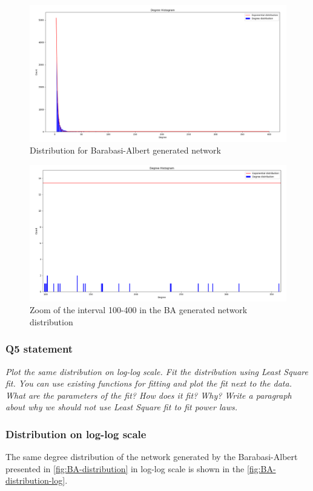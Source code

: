 \documentclass{article}
\begin{document}
\begin{figure}[h]
  \centering
  \includegraphics[scale=0.35]{fig/BA-distribution.png}
  \caption{Distribution for Barabasi-Albert generated network}
  \label{fig:BA-distribution}
\end{figure} 

\newpage
\begin{figure}[h]
  \centering
  \includegraphics[scale=0.3]{fig/BA-distribution-zoom.png}
  \caption{Zoom of the interval 100-400 in the BA generated network distribution}
  \label{fig:BA-distribution-zoom}
\end{figure} 


\subsubsection{Q5 statement}
\textit{Plot the same distribution on log-log scale. Fit the distribution using Least Square fit. You can use existing functions for fitting and plot the fit next to the data. What are the parameters of the fit? How does it fit? Why? Write a paragraph about why we should not use Least Square fit to fit power laws.}

\subsubsection*{Distribution on log-log scale} 
The same degree distribution of the network generated by the Barabasi-Albert presented in \autoref{fig:BA-distribution} in log-log scale is shown in the \autoref{fig:BA-distribution-log}. 
\end{document}
